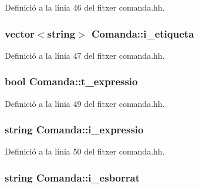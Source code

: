 Definició a la línia 46 del fitxer comanda.\+hh.

\hypertarget{class_comanda_a1d193f66ea6d2681ab79a16192da3114}{}
\subsubsection[{i\+\_\+etiqueta}]{\setlength{\rightskip}{0pt plus 5cm}vector$<$string$>$ Comanda\+::i\+\_\+etiqueta\hspace{0.3cm}{\ttfamily [private]}}\label{class_comanda_a1d193f66ea6d2681ab79a16192da3114}


Definició a la línia 47 del fitxer comanda.\+hh.

\hypertarget{class_comanda_ac7037525fc1cd9f49b02bd87cf4b6123}{}
\subsubsection[{t\+\_\+expressio}]{\setlength{\rightskip}{0pt plus 5cm}bool Comanda\+::t\+\_\+expressio\hspace{0.3cm}{\ttfamily [private]}}\label{class_comanda_ac7037525fc1cd9f49b02bd87cf4b6123}


Definició a la línia 49 del fitxer comanda.\+hh.

\hypertarget{class_comanda_a9236cdc5142b6a9f4116673abce06508}{}
\subsubsection[{i\+\_\+expressio}]{\setlength{\rightskip}{0pt plus 5cm}string Comanda\+::i\+\_\+expressio\hspace{0.3cm}{\ttfamily [private]}}\label{class_comanda_a9236cdc5142b6a9f4116673abce06508}


Definició a la línia 50 del fitxer comanda.\+hh.

\hypertarget{class_comanda_a269a43d5b283a23792791a2ba67747b0}{}
\subsubsection[{i\+\_\+esborrat}]{\setlength{\rightskip}{0pt plus 5cm}string Comanda\+::i\+\_\+esborrat\hspace{0.3cm}{\ttfamily [private]}}\label{class_comanda_a269a43d5b283a23792791a2ba67747b0}


